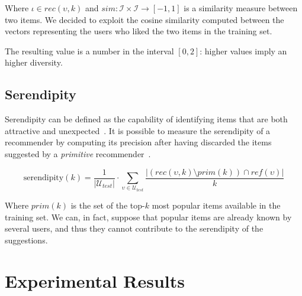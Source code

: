 Where $\iota \in rec(\upsilon, k)$ and $sim : \mathcal{I} \times \mathcal{I} \to [-1, 1]$ is a similarity measure between two items. We decided to exploit the cosine similarity computed between the vectors representing the users who liked the two items in the training set.

The resulting value is a number in the interval $[0, 2]$: higher values imply an higher diversity.

\subsection{Serendipity}
Serendipity can be defined as the capability of identifying items that are both attractive and unexpected~\cite{Gemmis2015b}. It is possible to measure the serendipity of a recommender by computing its precision after having discarded the items suggested by a \textit{primitive} recommender~\cite{Ge2010}.

\begin{equation*}
\mathrm{serendipity}(k) = \frac{1}{|\mathcal{U}_{test}|} \cdot \sum_{\upsilon \in \mathcal{U}_{test}} \frac{|(rec(\upsilon, k) \setminus prim(k)) \cap ref(\upsilon)|}{k}
\end{equation*}

Where $prim(k)$ is the set of the top-$k$ most popular items available in the training set. We can, in fact, suppose that popular items are already known by several users, and thus they cannot contribute to the serendipity of the suggestions.

\section{Experimental Results}
\label{lab:sec:results}

